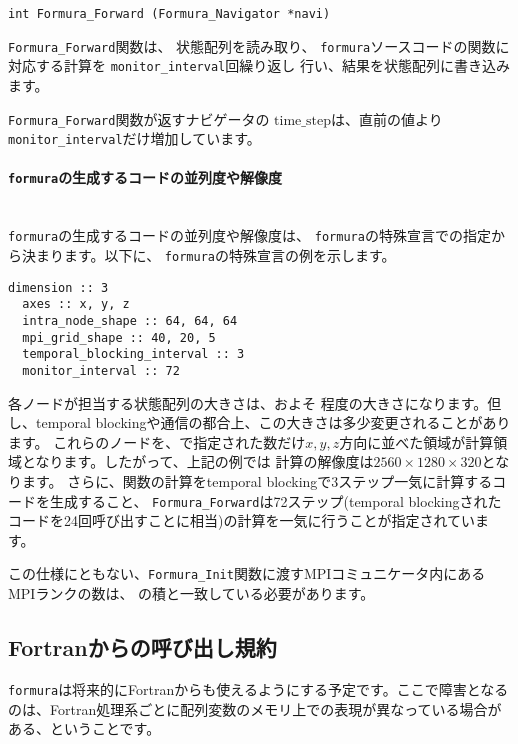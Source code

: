 \documentclass{jsarticle}
\newcommand{\formura}{{\texttt{formura}}}
\begin{document}
\begin{screen}
\begin{verbatim}
int Formura_Forward (Formura_Navigator *navi)
\end{verbatim}
\end{screen}
\verb`Formura_Forward`関数は、
状態配列を読み取り、
\formura ソースコードの関数に対応する計算を
\verb`monitor_interval`回繰り返し
行い、結果を状態配列に書き込みます。

 \verb`Formura_Forward`関数が返すナビゲータの
 $\mathrm{time\_step}$は、直前の値より
\verb`monitor_interval`だけ増加しています。

\paragraph{\formura の生成するコードの並列度や解像度} \leavevmode\\

\formura の生成するコードの並列度や解像度は、
\formura の特殊宣言での指定から決まります。以下に、
\formura の特殊宣言の例を示します。

\begin{lstlisting}[mathescape]
  dimension :: 3
  axes :: x, y, z
  intra_node_shape :: 64, 64, 64
  mpi_grid_shape :: 40, 20, 5
  temporal_blocking_interval :: 3
  monitor_interval :: 72
\end{lstlisting}

各ノードが担当する状態配列の大きさは、およそ
程度の大きさになります。但し、temporal blockingや通信の都合上、この大きさは多少変更されることがあります。
これらのノードを、で指定された数だけ$x,y,z$方向に並べた領域が計算領域となります。したがって、上記の例では
計算の解像度は$2560 \times 1280 \times 320$となります。
さらに、関数の計算をtemporal blockingで3ステップ一気に計算するコードを生成すること、
\verb`Formura_Forward`は72ステップ(temporal blockingされたコードを24回呼び出すことに相当)の計算を一気に行うことが指定されています。

この仕様にともない、\verb`Formura_Init`関数に渡すMPIコミュニケータ内にあるMPIランクの数は、
の積と一致している必要があります。


\subsection{Fortranからの呼び出し規約}

\formura は将来的にFortranからも使えるようにする予定です。ここで障害となるのは、Fortran処理系ごとに配列変数のメモリ上での表現が異なっている場合がある、ということです。
\end{document}
